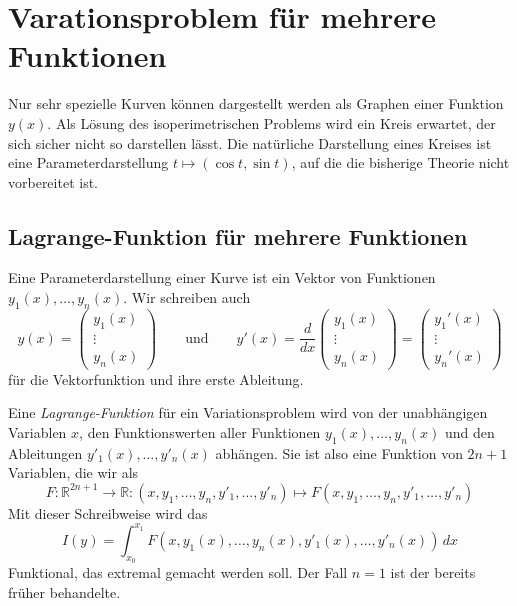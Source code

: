 %
%
%
\section{Varationsproblem für mehrere Funktionen
\label{buch:variation:section:mehrerefunktionen}}
Nur sehr spezielle Kurven können dargestellt werden als Graphen
einer Funktion $y(x)$.
Als Lösung des isoperimetrischen Problems wird ein Kreis erwartet,
der sich sicher nicht so darstellen lässt.
Die natürliche Darstellung eines Kreises ist eine Parameterdarstellung
$t\mapsto(\cos t,\sin t)$, auf die die bisherige Theorie nicht
vorbereitet ist.

%
%
\subsection{Lagrange-Funktion für mehrere Funktionen
\label{buch:variation:mehrerefunction:subsection:lagrangefunktion}}
Eine Parameterdarstellung einer Kurve ist ein Vektor von Funktionen
$y_1(x),\dots,y_n(x)$.
Wir schreiben auch
\[
y(x)
=
\begin{pmatrix}
y_1(x)\\
\vdots\\
y_n(x)
\end{pmatrix}
\qquad\text{und}\qquad
y'(x)
=
\frac{d}{dx}
\begin{pmatrix}
y_1(x)\\
\vdots\\
y_n(x)
\end{pmatrix}
=
\begin{pmatrix}
y_1'(x)\\
\vdots\\
y_n'(x)
\end{pmatrix}
\]
für die Vektorfunktion und ihre erste Ableitung.

Eine {\em Lagrange-Funktion} für ein Variationsproblem wird von
der unabhängigen Variablen $x$, den Funktionswerten aller Funktionen
$y_1(x),\dots,y_n(x)$ und den Ableitungen $y'_1(x),\dots,y'_n(x)$
abhängen.
Sie ist also eine Funktion von $2n+1$ Variablen, die wir als
\begin{equation*}
F
\colon
\mathbb{R}^{2n+1}\to\mathbb{R}
:
(x,y_1,\dots,y_n,y'_1,\dots,y'_n)\mapsto F(x,y_1,\dots,y_n,y'_1,\dots,y'_n)
\end{equation*}
Mit dieser Schreibweise wird das
\[
I(y)
=
\int_{x_0}^{x_1}
F(x,y_1(x),\dots,y_n(x),y'_1(x),\dots,y'_n(x))\,dx
\]
Funktional, das extremal gemacht werden soll.
Der Fall $n=1$ ist der bereits früher behandelte.

